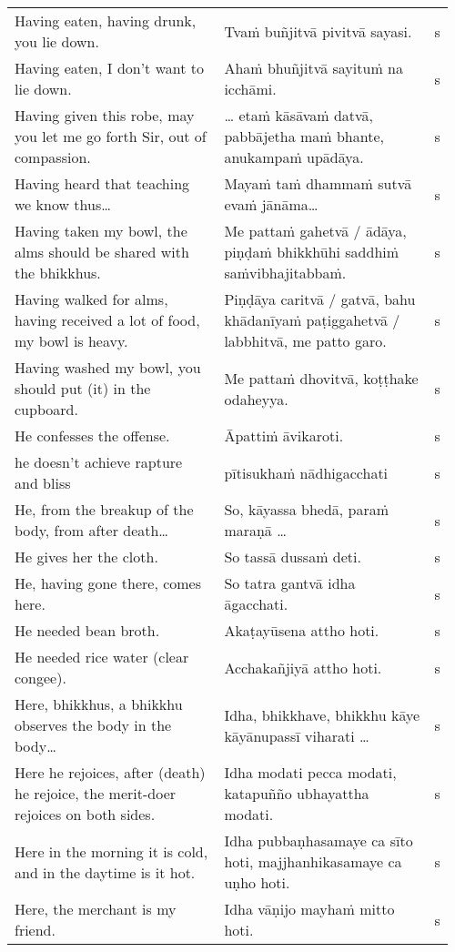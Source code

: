 \documentclass[a5paper]{memoir}
\begin{document}
\begin{longtable}{L{0.48\linewidth} L{0.48\linewidth} H}
Having eaten, having drunk, you lie down. & Tvaṁ buñjitvā pivitvā sayasi. & s\\[0pt]
Having eaten, I don't want to lie down. & Ahaṁ bhuñjitvā sayituṁ na icchāmi. & s\\[0pt]
Having given this robe, may you let me go forth Sir, out of compassion. & \ldots{} etaṁ kāsāvaṁ datvā, pabbājetha maṁ bhante, anukampaṁ upādāya. & s\\[0pt]
Having heard that teaching we know thus\ldots{} & Mayaṁ taṁ dhammaṁ sutvā evaṁ jānāma\ldots{} & s\\[0pt]
Having taken my bowl, the alms should be shared with the bhikkhus. & Me pattaṁ gahetvā / ādāya, piṇḍaṁ bhikkhūhi saddhiṁ saṁvibhajitabbaṁ. & s\\[0pt]
Having walked for alms, having received a lot of food, my bowl is heavy. & Piṇḍāya caritvā / gatvā, bahu khādanīyaṁ paṭiggahetvā / labbhitvā, me patto garo. & s\\[0pt]
Having washed my bowl, you should put (it) in the cupboard. & Me pattaṁ dhovitvā, koṭṭhake odaheyya. & s\\[0pt]
He confesses the offense. & Āpattiṁ āvikaroti. & s\\[0pt]
he doesn't achieve rapture and bliss & pītisukhaṁ nādhigacchati & s\\[0pt]
He, from the breakup of the body, from after death\ldots{} & So, kāyassa bhedā, paraṁ maraṇā \ldots{} & s\\[0pt]
He gives her the cloth. & So tassā dussaṁ deti. & s\\[0pt]
He, having gone there, comes here. & So tatra gantvā idha āgacchati. & s\\[0pt]
He needed bean broth. & Akaṭayūsena attho hoti. & s\\[0pt]
He needed rice water (clear congee). & Acchakañjiyā attho hoti. & s\\[0pt]
Here, bhikkhus, a bhikkhu observes the body in the body\ldots{} & Idha, bhikkhave, bhikkhu kāye kāyānupassī viharati \ldots{} & s\\[0pt]
Here he rejoices, after (death) he rejoice, the merit-doer rejoices on both sides. & Idha modati pecca modati, katapuñño ubhayattha modati. & s\\[0pt]
Here in the morning it is cold, and in the daytime is it hot. & Idha pubbaṇhasamaye ca sīto hoti, majjhanhikasamaye ca uṇho hoti. & s\\[0pt]
Here, the merchant is my friend. & Idha vāṇijo mayhaṁ mitto hoti. & s\\[0pt]

\end{longtable}
\end{document}

